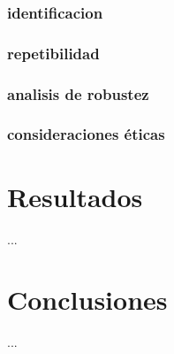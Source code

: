 \documentclass[12pt,letterpaper,oneside,openright]{book}
\begin{document}
\subsection{identificacion}
\subsection{repetibilidad}
\subsection{analisis de robustez}
\subsection{consideraciones éticas}

\chapter{Resultados}

...

\chapter{Conclusiones}

...


 
\end{document}
